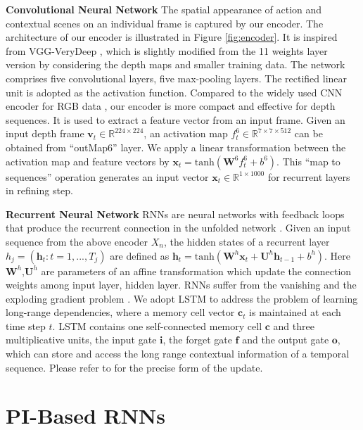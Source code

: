 \documentclass[10pt,twocolumn,letterpaper]{article}
\begin{document}
\noindent \textbf{Convolutional Neural Network} The spatial appearance of action and contextual scenes on an individual frame is captured by our encoder. The architecture of our encoder is illustrated in Figure \ref{fig:encoder}. It is inspired from VGG-VeryDeep \cite{Simonyan15c}, which is slightly modified from the 11 weights layer version by considering the depth maps and smaller training data. The network comprises five convolutional layers, five max-pooling layers. The rectified linear unit \cite{Alex_nips_2012} is adopted as the activation function. Compared to the widely used CNN encoder for RGB data \cite{Mahasseni_2016_CVPR,Simonyan15c}, our encoder is more compact and effective for depth sequences. It is used to extract a feature vector from an input frame. Given an input depth frame $\bm{v}_t \in \mathbb{R}^{224\times224}$, an activation map $f_t^6 \in \mathbb{R}^{7\times7\times512}$ can be obtained from ``outMap6'' layer. We apply a linear transformation between the activation map and feature vectors by $\bm{x}_t=\mathrm{tanh}(\bm{W}^6f_t^6+b^6)$. This ``map to sequences'' operation generates an input vector $\bm{x}_t \in \mathbb{R}^{1\times1000}$ for recurrent layers in refining step.


\noindent \textbf{Recurrent Neural Network} RNNs are neural networks with feedback loops that produce the recurrent connection in the unfolded network \cite{Chung_NIPS2015,Jonas_2016_aaai,Qiang_aaai_2016}.
Given an input sequence from the above encoder $X_n$, the hidden states of a recurrent layer $h_j = (\bm{h}_t : t=1,...,T_j)$ are defined as  $\bm{h}_{t}=\mathrm{tanh}(\bm{W}^{h}\bm{x}_{t}+\bm{U}^{h}\bm{h}_{t-1}+b^h)$. Here $\bm{W}^h$,$\bm{U}^h$ are parameters of an affine transformation which update the connection weights among input layer, hidden layer. RNNs suffer from the vanishing and the exploding gradient problem \cite{Bengio_1994}. We adopt LSTM \cite{Hochreiter_1997} to address the problem of learning long-range dependencies, where a memory cell vector $\bm{c}_t$ is maintained at each time step $t$.
LSTM contains one self-connected memory cell $\bm{c}$ and three multiplicative units, \ie the input gate $\bm{i}$, the forget gate $\bm{f}$ and the output gate $\bm{o}$, which can store and access the long range contextual information of a temporal sequence. Please refer to \cite{Hochreiter_1997} for the precise form of the update.

\section{PI-Based RNNs}
\end{document}
